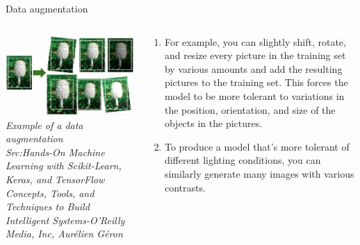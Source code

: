 \begin{frame}{Data augmentation}
	\begin{columns}[T]
        \begin{column}{0.4\textwidth}
        	\includegraphics[width=\textwidth]{images/Data Aug.png}
			\tiny{\textit{Example of a data augmentation\\ Src:Hands-On Machine Learning with Scikit-Learn, Keras, and TensorFlow  Concepts, Tools, and Techniques to Build Intelligent Systems-O'Reilly Media, Inc, Aurélien Géron}}
        \end{column}
		\begin{column}{0.6\textwidth}
			\begin{enumerate}[$\bullet$]
				\item For example, you can slightly shift, rotate, and resize every picture in the
				training set by various amounts and add the resulting pictures to the
				training set. This forces the model to be more tolerant to
				variations in the position, orientation, and size of the objects in the
				pictures. \pause
				\item To produce a model that's more tolerant of different lighting
				conditions, you can similarly generate many images with various
				contrasts. 
			\end{enumerate}
		\end{column} 
    \end{columns}
\end{frame}
